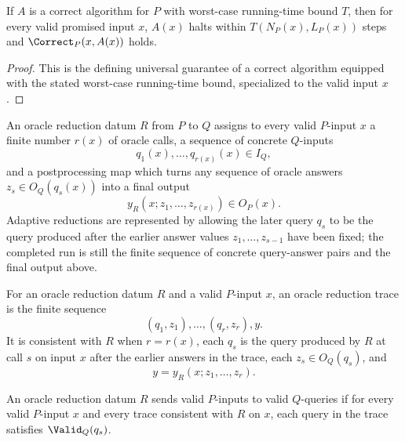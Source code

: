 \begin{lemma}
  \label{lem:solver-halts-on-promised-input-set}
  If $A$ is a correct algorithm for $P$ with worst-case running-time bound $T$,
  then for every valid promised input $x$, $A(x)$ halts within
  $T(N_P(x),L_P(x))$ steps and $\Correct_P(x,A(x))$ holds.
\end{lemma}
\begin{proof}
  This is the defining universal guarantee of a correct algorithm equipped with
  the stated worst-case running-time bound, specialized to the valid input
  $x$.
\end{proof}

\begin{definition}
  \label{def:oracle-reduction-data}
  An oracle reduction datum $R$ from $P$ to $Q$ assigns to every valid
  $P$-input $x$ a finite number $r(x)$ of oracle calls, a sequence of concrete
  $Q$-inputs
  \[
    q_1(x),\ldots,q_{r(x)}(x)\in I_Q,
  \]
  and a postprocessing map which turns any sequence of oracle answers
  $z_s\in O_Q(q_s(x))$ into a final output
  \[
    y_R(x;z_1,\ldots,z_{r(x)})\in O_P(x).
  \]
  Adaptive reductions are represented by allowing the later query $q_s$ to be
  the query produced after the earlier answer values
  $z_1,\ldots,z_{s-1}$ have been fixed; the completed run is still the finite
  sequence of concrete query-answer pairs and the final output above.
\end{definition}

\begin{definition}
  \label{def:oracle-reduction-trace}
  For an oracle reduction datum $R$ and a valid $P$-input $x$, an oracle
  reduction trace is the finite sequence
  \[
    (q_1,z_1),\ldots,(q_r,z_r),y.
  \]
  It is consistent with $R$ when $r=r(x)$, each $q_s$ is the query produced by
  $R$ at call $s$ on input $x$ after the earlier answers in the trace, each
  $z_s\in O_Q(q_s)$, and
  \[
    y=y_R(x;z_1,\ldots,z_r).
  \]
\end{definition}

\begin{definition}
  \label{def:valid-oracle-queries}
  An oracle reduction datum $R$ sends valid $P$-inputs to valid $Q$-queries if
  for every valid $P$-input $x$ and every trace consistent with $R$ on $x$,
  each query in the trace satisfies $\Valid_Q(q_s)$.
\end{definition}


